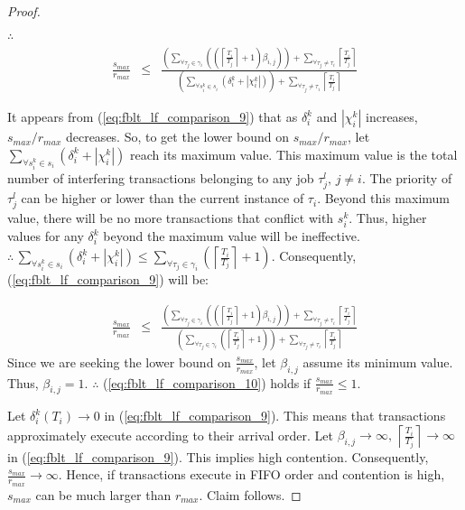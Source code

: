 \documentclass[prodmode,acmtecs]{acmsmall}
\begin{document}
\begin{compactenum}
\begin{proof}
\begin{eqnarray}
\end{eqnarray}
$\therefore$
\begin{eqnarray}
\frac{s_{max}}{r_{max}} & \le & \frac{\left(\sum_{\forall\tau_{j}\in\gamma_{i}}\left(\left(\left\lceil \frac{T_{i}}{T_{j}}\right\rceil +1\right)\beta_{i,j}\right)\right)+\sum_{\forall\tau_{j}\neq\tau_{i}}\left\lceil \frac{T_{i}}{T_{j}}\right\rceil }{\left(\sum_{\forall s_{i}^{k}\in s_{i}}\left(\delta_{i}^{k}+|\chi_{i}^{k}|\right)\right)+\sum_{\forall\tau_{j}\neq\tau_{i}}\left\lceil \frac{T_{i}}{T_{j}}\right\rceil }\label{eq:fblt_lf_comparison_9}
\end{eqnarray}



It appears from (\ref{eq:fblt_lf_comparison_9}) that as $\delta_{i}^{k}$ and $|\chi_{i}^{k}|$ increases, $s_{max}/r_{max}$ decreases.
So, to get the lower bound on $s_{max}/r_{max}$, let $\sum_{\forall s_{i}^{k}\in s_{i}}\left(\delta_{i}^{k}+|\chi_{i}^{k}|\right)$
reach its maximum value. This maximum value is the total number
of interfering transactions belonging to any job $\tau_{j}^{l},\, j\ne i$.
The priority of $\tau_{j}^{l}$ can be higher or lower than the current instance
of $\tau_{i}$. Beyond this maximum value, there will be no more transactions that conflict with $s_{i}^{k}$. Thus, higher values for any $\delta_{i}^{k}$
beyond the maximum value will be ineffective. $\therefore\,\sum_{\forall s_{i}^{k}\in s_{i}}\left(\delta_{i}^{k}+|\chi_{i}^{k}|\right)\le\sum_{\forall\tau_{j}\in\gamma_{i}}\left(\left\lceil \frac{T_{i}}{T_{j}}\right\rceil +1\right)$.
Consequently, (\ref{eq:fblt_lf_comparison_9}) will be:

\begin{eqnarray}
\frac{s_{max}}{r_{max}} & \le & \frac{\left(\sum_{\forall\tau_{j}\in\gamma_{i}}\left(\left(\left\lceil \frac{T_{i}}{T_{j}}\right\rceil +1\right)\beta_{i,j}\right)\right)+\sum_{\forall\tau_{j}\neq\tau_{i}}\left\lceil \frac{T_{i}}{T_{j}}\right\rceil }{\left(\sum_{\forall\tau_{j}\in\gamma_{i}}\left(\left\lceil \frac{T_{i}}{T_{j}}\right\rceil +1\right)\right)+\sum_{\forall\tau_{j}\neq\tau_{i}}\left\lceil \frac{T_{i}}{T_{j}}\right\rceil }\label{eq:fblt_lf_comparison_10}
\end{eqnarray}
Since we are seeking the lower bound on $\frac{s_{max}}{r_{max}}$, let
$\beta_{i,j}$ assume its minimum value. Thus, $\beta_{i,j}=1$. $\therefore$
(\ref{eq:fblt_lf_comparison_10}) holds if $\frac{s_{max}}{r_{max}}\le1$.

Let $\delta_{i}^{k}(T_{i})\rightarrow0$ in (\ref{eq:fblt_lf_comparison_9}).
This means that transactions approximately execute according to their arrival order.
Let $\beta_{i,j}\rightarrow\infty,\,\left\lceil \frac{T_{i}}{T_{j}}\right\rceil \rightarrow\infty$
in (\ref{eq:fblt_lf_comparison_9}). This implies high contention.
Consequently, $\frac{s_{max}}{r_{max}}\rightarrow\infty$. Hence, if
transactions execute in FIFO order and contention is high, $s_{max}$
can be much larger than $r_{max}$. Claim follows.
\end{proof}


\end{compactenum}
\end{document}
